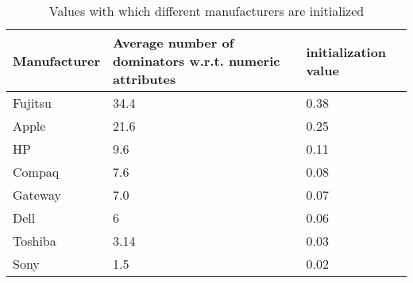\begin{table}
\renewcommand{\arraystretch}{1.3}
 \centering
 \begin{tabular}{l p{6cm} l}
  \hline \hline
   Manufacturer & Average number of dominators w.r.t. numeric attributes & initialization value \\
  \hline
  Fujitsu & 34.4 & 0.38  \\
  Apple & 21.6 &   0.25\\
  HP & 9.6 &   0.11\\
  Compaq & 7.6&   0.08\\
  Gateway & 7.0 &   0.07\\
  Dell & 6 &   0.06\\
  Toshiba & 3.14 &   0.03\\
  Sony & 1.5 &   0.02\\
  \hline \hline
 \end{tabular}
 \caption{Values with which different manufacturers are initialized}
 \label{tab:marketEq}
\end{table}
